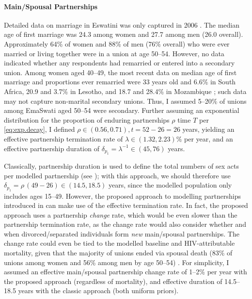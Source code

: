 \paragraph{Main/Spousal Partnerships}
Detailed data on marriage in Eswatini was only captured in 2006 \cite[Table~6.1]{SDHS2006}.
The median age of first marriage was 24.3 among women and 27.7 among men (26.0 overall).
Approximately 64\% of women and 88\% of men (76\% overall) who were ever married or living together
were in a union at age 50--54.
However, no data indicated whether any respondents had remarried or entered into a secondary union.
Among women aged 40--49, the most recent data on
median age of first marriage and proportions ever remarried were
33 years old and 6.6\% in South Africa,
20.9 and 3.7\% in Lesotho, and 18.7 and 28.4\% in Mozambique \cite{John2022};
such data may not capture non-marital secondary unions.
Thus, I assumed 5--20\% of unions among EmaSwati aged 50--54 were secondary.
Further assuming an exponential distribution for
the proportion of enduring partnerships $\rho$ \vs time $T$ per \eqref{eq:exp.decay},
I defined $\rho \in (0.56, 0.71), t = 52 - 26 = 26$ years, yielding
an effective partnership termination rate of $\lambda \in (1.32, 2.23)\%$ per year, and
an effective partnership duration of $\delta_{p_{1}} = \lambda^{-1} \in (45, 76)$ years.
\par
Classically, partnership duration is used to define
the total numbers of sex acts per modelled partnership (see );
with this approach, we should therefore use $\delta_{p_{1}} = \rho\,(49 - 26) \in (14.5, 18.5)$ years,
since the modelled population only includes ages 15--49.
However, the proposed approach to modelling partnerships introduced in 
can make use of the effective termination rate.
In fact, the proposed approach uses a partnership \emph{change} rate,
which would be even slower than the partnership termination rate,
as the change rate would also consider whether and when
divorced/separated individuals form \emph{new} main/spousal partnerships.
The change rate could even be tied to the modelled baseline and HIV-attributable mortality,
given that the majority of unions ended via spousal death
(83\% of unions among women and 56\% among men by age 50--54) \cite{SDHS2006}.
For simplicity, I assumed an effective main/spousal partnership change rate of 1--2\% per year
with the proposed approach (regardless of mortality),
and effective duration of 14.5--18.5 years with the classic approach (both uniform priors).
